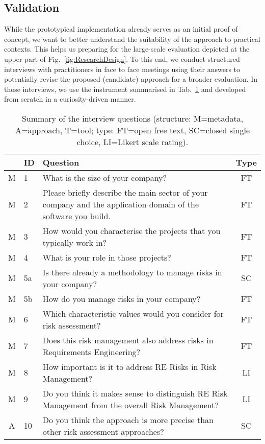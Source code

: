 \documentclass[lnbip]{svmultln}
\begin{document}
\subsection{Validation}
\label{sec:ValidationDesign}
While the prototypical implementation already serves as an initial proof of concept, we want to better understand the suitability of the approach to practical contexts. This helps us preparing for the large-scale evaluation depicted at the upper part of Fig.~\ref{fig:ResearchDesign}. To this end, we conduct structured interviews with practitioners in face to face meetings using their answers to potentially revise the proposed (candidate) approach for a broader evaluation. In those interviews, we use the instrument summarised in Tab.~\ref{tab:EQuestionnaire} and developed from scratch in a curiosity-driven manner.
\begin{table}[htb]
\scriptsize
\centering
\caption{Summary of the interview questions (structure: M=metadata, A=approach, T=tool; type: FT=open free text, SC=closed single choice, LI=Likert scale rating).} 
\label{tab:EQuestionnaire} 
\begin{tabular}{clp{10.4cm}c}
\toprule  
& \textbf{ID} & \textbf{Question} & \textbf{Type} \\ 
\midrule
	M & 1 & What is the size of your company? & FT\\
	M & 2 & Please briefly describe the main sector of your company and the application domain of the software you build. & FT  \\ 
	M & 3 & How would you characterise the projects that you typically work in? & FT  \\ 
	M & 4 & What is your role in those projects? & FT  \\ 
	M & 5a & Is there already a methodology to manage risks in your company? & SC\\ 
	M & 5b & How do you manage risks in your company? & FT\\ 
	M & 6 & Which characteristic values would you consider for risk assessment? &  FT \\ 
	M & 7 & Does this risk management also address risks in Requirements Engineering? &  FT \\ 
	M & 8 & How important is it to address RE Risks in Risk Management? &  LI  \\ 
	M & 9 & Do you think it makes sense to distinguish RE Risk Management from the overall Risk Management?  &  LI  \\ 
	\midrule
	A & 10 & Do you think the approach is more precise than other risk assessment approaches?  &  SC \\ 

\end{tabular}
\end{table}
\end{document}

